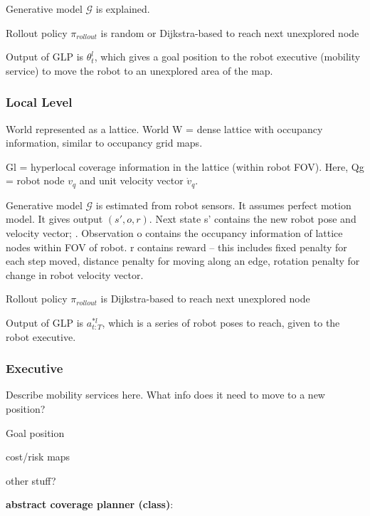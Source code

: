\documentclass{article}
\newcommand{\ph}[1]{{\textbf{#1}:}} %
\begin{document}
Generative model $\mathcal{G}$ is explained.

Rollout policy $\pi_{rollout}$ is random or Dijkstra-based to reach next unexplored node

Output of GLP is $\theta^l_t$, which gives a goal position to the robot executive (mobility service) to move the robot to an unexplored area of the map.

\subsubsection{Local Level}
World represented as a lattice. World W = dense lattice with occupancy information, similar to occupancy grid maps.

Gl = hyperlocal coverage information in the lattice (within robot FOV). Here, Qg = robot node $v_q$  and unit velocity vector $\dot{v}_q$. 

Generative model $\mathcal{G}$ is estimated from robot sensors. It assumes perfect motion model. It gives output $(s', o, r)$. Next state s' contains the new robot pose and velocity vector; . Observation o contains the occupancy information of lattice nodes within FOV of robot. r contains reward -- this includes fixed penalty for each step moved, distance penalty for moving along an edge, rotation penalty for change in robot velocity vector.

Rollout policy $\pi_{rollout}$ is Dijkstra-based to reach next unexplored node

Output of GLP is $a^{*l}_{t:T}$, which is a series of robot poses to reach, given to the robot executive.

\subsubsection{Executive}
Describe mobility services here. What info does it need to move to a new position?

Goal position

cost/risk maps

other stuff?










\ph{abstract coverage planner (class)}
\end{document}
